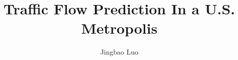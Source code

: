 \documentclass{amsart}
\begin{document}
%
%
\title[Traffic Flow Prediction]{Traffic Flow Prediction In a U.S. Metropolis}%

\author{Jingbao Luo}
\address[A.~1]{School of Economics and Management,
Nanjing University of Science and Technology, Jiangsu 210094, China}%





\date{\gitAuthorDate}%





\maketitle
\tableofcontents

\newpage


\end{document}
